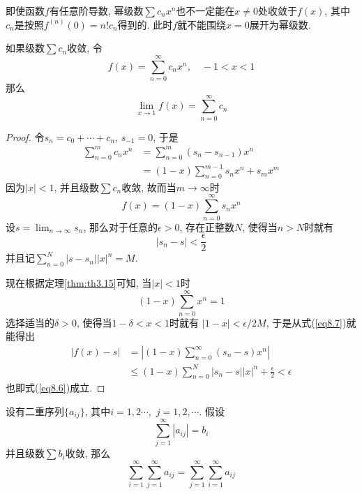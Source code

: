 \documentclass[cn,12pt,math=mtpro2,citestyle=gb7714-2015,bibstyle=gb7714-2015,twocol]{elegantbook}
\newcommand{\limn }{\lim_{n\to\infty}}
\begin{document}
\begin{remark}
即使函数$f$有任意阶导数, 幂级数$\sum c_nx^n$也不一定能在$x\neq 0$处收敛于$f(x)$, 其中$c_n$是按照$f^{(n)}(0)=n!c_n$得到的. 此时$f$就不能围绕$x=0$展开为幂级数.
\end{remark}
\begin{theorem}\label{thm:th8.2}
  如果级数$\sum c_n$收敛, 令
  $$f(x)=\sum_{n=0}^{\infty}c_nx^n, \quad -1<x<1$$
  那么
  \begin{equation}\label{eq8.6}
    \lim_{x\to1}f(x)=\sum_{n=0}^{\infty}c_n
  \end{equation}
\end{theorem}
\begin{proof}
  令$s_n=c_0+\cdots+c_n$, $s_{-1}=0$, 于是
  \begin{align*}
  \sum_{n=0}^{m}c_nx^n&=\sum_{n=0}^{m}(s_n-s_{n-1})x^n \\
  &=(1-x)\sum_{n=0}^{m-1}s_nx^n+s_mx^m
  \end{align*}
  因为$|x|<1$, 并且级数$\sum c_n$收敛, 故而当$m\to\infty$时
  \begin{equation}\label{eq8.7}
    f(x)=(1-x)\sum_{n=0}^{\infty}s_nx^n
  \end{equation}
 设$s=\limn s_n$, 那么对于任意的$\epsilon>0$, 存在正整数$N$, 使得当$n>N$时就有
  $$|s_n-s|<\frac{\epsilon}{2}$$
  并且记$\sum_{n=0}^{N}|s-s_n||x|^n=M$.

  现在根据定理\ref{thm:th3.15}可知, 当$|x|<1$时
  $$(1-x)\sum_{n=0}^{\infty}x^n=1$$
  选择适当的$\delta>0$, 使得当$1-\delta<x<1$时就有
  $\displaystyle |1-x|< \epsilon/2M$, 于是从式(\ref{eq8.7})就能得出
  \begin{align*}
  |f(x)-s|&=\left|(1-x)\sum_{n=0}^{\infty}(s_n-s)x^n\right| \\
  &\leq(1-x)\sum_{n=0}^{N}|s_n-s||x|^n+\frac{\epsilon}{2}<\epsilon
  \end{align*}
  也即式(\ref{eq8.6})成立.
\end{proof}
\begin{theorem}\label{thm:th8.3}
  设有二重序列$\{a_{ij}\}$, 其中$i=1,2\cdots,$ $j=1,2,\cdots$. 假设
  \begin{equation}\label{eq8.8}
    \sum_{j=1}^{\infty}|a_{ij}|=b_i
  \end{equation}
  并且级数$\sum b_i$收敛, 那么
  $$\sum_{i=1}^{\infty}\sum_{j=1}^{\infty}a_{ij}=\sum_{j=1}^{\infty}\sum_{i=1}^{\infty}a_{ij}$$
\end{theorem}
\end{document}

